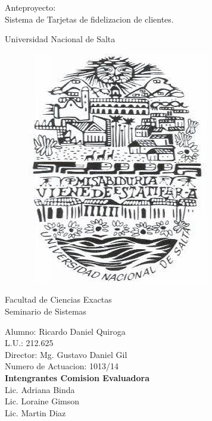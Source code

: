 
%


\begin{titlepage}


\begin{center}
    {\fontsize{35}{35} \selectfont
    Anteproyecto: \\
    Sistema de Tarjetas de fidelizacion de clientes. \\[1.3cm] }
\end{center}


\begin{center}
    \LARGE Universidad Nacional de Salta \\
    \begin{figure}[h]
        \begin{center}
        \includegraphics[scale=0.5]{resourse/logo-UNSa.jpg}
        \end{center}
    \end{figure}

    
    \LARGE Facultad de Ciencias Exactas \\
    Seminario de Sistemas \\ [1.3cm]
\end{center}


\begin{flushright}
    {\Large 
    Alumno: Ricardo Daniel Quiroga \\
    L.U.: 212.625 \\
    Director: Mg. Gustavo Daniel Gil \\
    Numero de Actuacion: 1013/14
    \\[1.0cm]
    \textbf{ Intengrantes Comision Evaluadora } \\
    Lic. Adriana Binda \\
    Lic. Loraine Gimson \\
    Lic. Martin Diaz \\
    }
    
\end{flushright}



\end{titlepage}


